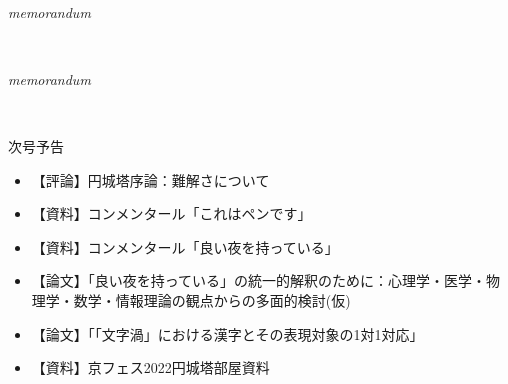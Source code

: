 \documentclass[10pt, a5paper, twoside]{jsarticle}
\theoremstyle{definition}
\begin{document}
	~ %

	\begin{center}

		\Large{\textit{memorandum}}

	\end{center}

	\newpage

		~ %

	\begin{center}

		\Large{\textit{memorandum}}

	\end{center}

	\newpage

		~ %

	\begin{center}

		{\Large 次号予告}

			\vspace{10mm}

		\begin{itemize}

			\item 【評論】円城塔序論：難解さについて

				\vspace{3mm}

			\item 【資料】コンメンタール「これはペンです」

				\vspace{3mm}

			\item 【資料】コンメンタール「良い夜を持っている」

				\vspace{3mm}

			\item 【論文】「良い夜を持っている」の統一的解釈のために：心理学・医学・物理学・数学・情報理論の観点からの多面的検討(仮)

				\vspace{3mm}

			\item 【論文】「「文字渦」における漢字とその表現対象の1対1対応」

				\vspace{3mm}

			\item 【資料】京フェス2022円城塔部屋資料 
		
		\end{itemize}


	\end{center}
\end{document}
